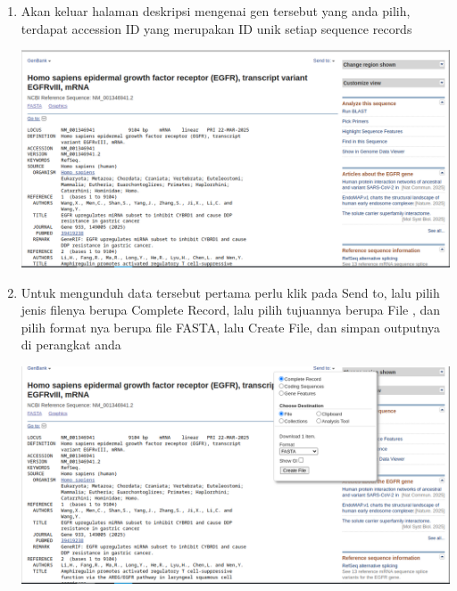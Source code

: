 \documentclass{article}
\begin{document}
\begin{flushleft}
\begin{enumerate}
                \item Akan keluar halaman deskripsi mengenai gen tersebut yang anda pilih, terdapat accession ID yang merupakan ID unik setiap sequence records
                \par\vspace{0.5cm}
                \includegraphics[scale=0.3]{Modul1/img/15.png}

                \item Untuk mengunduh data tersebut pertama perlu klik pada  Send to,  lalu pilih jenis filenya berupa Complete Record,  lalu pilih tujuannya berupa File , dan pilih format nya berupa file FASTA, lalu Create File, dan simpan outputnya di perangkat anda
                \par\vspace{0.5cm}
                \includegraphics[scale=0.3]{Modul1/img/16.png}
            \end{enumerate}
    \end{flushleft}
\end{document}
